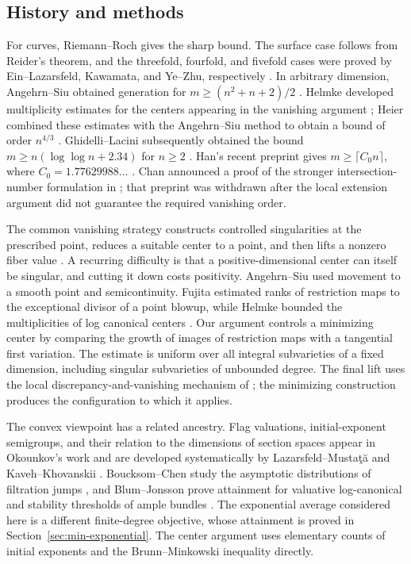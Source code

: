 \documentclass[11pt]{article}
\numberwithin{equation}{section}
\theoremstyle{definition}
\theoremstyle{remark}
\begin{document}
\subsection*{History and methods}
For curves,
Riemann--Roch gives the sharp bound. The surface case follows from
Reider's theorem, and the threefold, fourfold, and fivefold cases were
proved by Ein--Lazarsfeld, Kawamata, and Ye--Zhu, respectively
\cite{reider1988,einlazarsfeld1993,kawamata1997,yezhu2020}.
In arbitrary dimension, Angehrn--Siu obtained generation for
$m\geq (n^2+n+2)/2$ \cite{angehrnsiu1995}.
Helmke developed multiplicity estimates for the centers appearing in the
vanishing argument \cite{helmke1997,helmke1999}; Heier combined these
estimates with the Angehrn--Siu method to obtain a bound of order
$n^{4/3}$ \cite{heier2002}.
Ghidelli--Lacini subsequently obtained the bound
$m\geq n(\log\log n+2.34)$ for $n\geq2$
\cite[Theorem~1.1]{ghidellilacini2024}.
Han's recent preprint gives $m\geq\lceil C_0n\rceil$, where
$C_0=1.77629988\ldots$ \cite[Theorem~1.1]{han2026}.
Chan announced a proof of the stronger intersection-number formulation
in \cite[Theorem~1.3]{chan2024}; that preprint was withdrawn after the
local extension argument did not guarantee the required vanishing order.

The common vanishing strategy constructs controlled singularities at
the prescribed point, reduces a suitable center to a point, and then
lifts a nonzero fiber value \cite{einlazarsfeld1993,kawamata1997}.
A recurring difficulty is that a positive-dimensional center can itself
be singular, and cutting it down costs positivity. Angehrn--Siu used
movement to a smooth point and semicontinuity. Fujita estimated ranks
of restriction maps to the exceptional divisor of a point blowup,
while Helmke bounded the multiplicities of log canonical centers
\cite{angehrnsiu1995,fujita1993,helmke1997,helmke1999}.
Our argument controls a minimizing center by comparing the growth of
images of restriction maps with a tangential first variation. The
estimate is uniform over all integral subvarieties of a fixed dimension,
including singular subvarieties of unbounded degree. The final lift
uses the local discrepancy-and-vanishing mechanism of
\cite[\S1(1.6)]{fujita1993}; the minimizing construction produces the
configuration to which it applies.

The convex viewpoint has a related ancestry. Flag valuations,
initial-exponent semigroups, and their relation to the dimensions of
section spaces appear in Okounkov's work \cite{okounkov2003} and are
developed systematically by Lazarsfeld--Musta\c t\u a and
Kaveh--Khovanskii \cite{lazarsfeldmustata2009,kavehkhovanskii2012}.
Boucksom--Chen study the asymptotic distributions of filtration jumps
\cite{boucksomchen2011}, and Blum--Jonsson prove attainment for valuative
log-canonical and stability thresholds of ample bundles
\cite[Theorem~E]{blumjonsson2020}.
The exponential average considered here is a different finite-degree
objective, whose attainment is proved in Section~\ref{sec:min-exponential}.
The center argument uses elementary counts of initial exponents and the
Brunn--Minkowski inequality directly.
\end{document}
